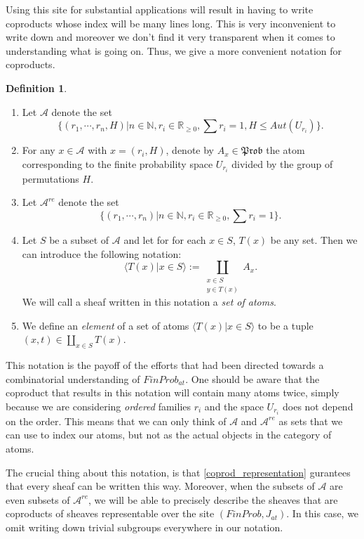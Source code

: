 \documentclass[a4paper]{amsproc}
\theoremstyle{plain}
\theoremstyle{definition}
\newtheorem{definition}[theorem]{Definition}
\theoremstyle{remark}
\numberwithin{equation}{section}
\begin{document}
Using this site for substantial applications will result in having to write coproducts whose index will be many lines long. This is very inconvenient to write down and moreover we don't find it very transparent when it comes to understanding what is going on. Thus, we give a more convenient notation for coproducts.

\begin{definition}
    \begin{enumerate}
        \item Let $\mathcal{A}$ denote the set 
        \[
            \{(r_1, \cdots, r_n, H) | n \in \mathbb{N}, r_i \in \mathbb{R}_{\geq 0}, \sum r_i = 1, H \leq Aut(U_{r_i})\}.
        \]
        \item For any $x \in \mathcal{A}$ with $x = (r_i, H)$, denote by $A_x \in \mathfrak{Prob}$ the atom corresponding to the finite probability space $U_{r_i}$ divided by the group of permutations $H$.
        \item Let $\mathcal{A}^{re}$ denote the set
        \[
            \{(r_1,\cdots, r_n) | n \in \mathbb{N}, r_i \in \mathbb{R}_{\geq 0}, \sum r_i = 1\}.
        \]
        \item Let $S$ be a subset of $\mathcal{A}$ and let for for each $x \in S$, $T(x)$ be any set. Then we can introduce the following notation:
        \[
            \langle T(x) | x \in S \rangle := \coprod_{\substack{x \in S \\ y \in T(x)}} A_x .
        \]
        We will call a sheaf written in this notation a \emph{set of atoms}.
        \item We define an \emph{element} of a set of atoms $\langle T(x) | x \in S \rangle$ to be a tuple $(x,t) \in \coprod_{x \in S} T(x)$.
    \end{enumerate}
\end{definition}

This notation is the payoff of the efforts that had been directed towards a combinatorial understanding of $FinProb_{at}$. One should be aware that the coproduct that results in this notation will contain many atoms twice, simply because we are considering \emph{ordered} families $r_i$ and the space $U_{r_i}$ does not depend on the order. This means that we can only think of $\mathcal{A}$ and $\mathcal{A}^{re}$ as sets that we can use to index our atoms, but not as the actual objects in the category of atoms.

The crucial thing about this notation, is that \ref{coprod_representation} gurantees that every sheaf can be written this way. Moreover, when the subsets of $\mathcal{A}$ are even subsets of $\mathcal{A}^{re}$, we will be able to precisely describe the sheaves that are coproducts of sheaves representable over the site $(FinProb, J_{at})$. In this case, we omit writing down trivial subgroups everywhere in our notation.
\end{document}
